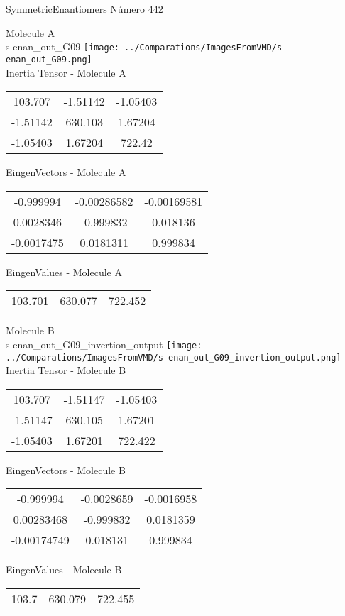 \vtab[-2cm]
\begin{center}
{\large SymmetricEnantiomers \tab Número 442}
\end{center}
\begin{multicols}{2}
\begin{center}

Molecule A \\ 
s-enan\_out\_G09
\texttt{[image: ../Comparations/ImagesFromVMD/s-enan\_out\_G09.png]}
\\
Inertia Tensor - Molecule A \\
\vtab

\begin{tabular}{|c c c|}
103.707	 & 	-1.51142	 & 	-1.05403	 \\
-1.51142	 & 	630.103	 & 	1.67204	 \\
-1.05403	 & 	1.67204	 & 	722.42
\end{tabular}

\vtab
 EingenVectors - Molecule A     \\
\vtab
\begin{tabular}{|c c c|}
-0.999994	 & 	-0.00286582	 & 	-0.00169581	 \\
0.0028346	 & 	-0.999832	 & 	0.018136	 \\
-0.0017475	 & 	0.0181311	 & 	0.999834
\end{tabular}

\vtab
 EingenValues - Molecule A     \\
\vtab
\begin{tabular}{|c c c|}
103.701	 & 	630.077	 & 	722.452	 \\
\end{tabular}
\columnbreak

Molecule B \\ 
s-enan\_out\_G09\_invertion\_output
\texttt{[image: ../Comparations/ImagesFromVMD/s-enan\_out\_G09\_invertion\_output.png]}
\\
Inertia Tensor - Molecule B \\
\vtab

\begin{tabular}{|c c c|}
103.707	 & 	-1.51147	 & 	-1.05403	 \\
-1.51147	 & 	630.105	 & 	1.67201	 \\
-1.05403	 & 	1.67201	 & 	722.422
\end{tabular}

\vtab
 EingenVectors - Molecule B     \\
\vtab
\begin{tabular}{|c c c|}
-0.999994	 & 	-0.0028659	 & 	-0.0016958	 \\
0.00283468	 & 	-0.999832	 & 	0.0181359	 \\
-0.00174749	 & 	0.018131	 & 	0.999834
\end{tabular}

\vtab
 EingenValues - Molecule B     \\
\vtab
\begin{tabular}{|c c c|}
103.7	 & 	630.079	 & 	722.455	 \\
\end{tabular}

\end{center}
\end{multicols}
